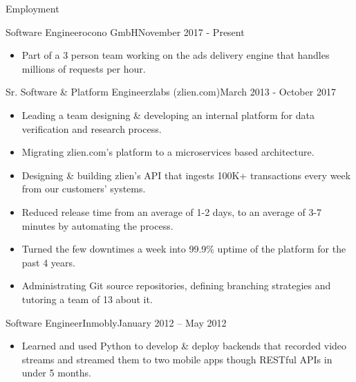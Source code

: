 \documentclass[]{mosabcv}
\begin{document}
    \makeheader

    \begin{cvsection}{Employment}
        \begin{cvsubsection}{Software Engineer}{ocono GmbH}{November 2017 - Present}
            \begin{itemize}
                \item Part of a 3 person team working on the ads delivery engine that handles millions of requests per hour.
            \end {itemize}

        \end{cvsubsection}
			\begin{cvsubsection}{Sr. Software \& Platform Engineer}{zlabs (zlien.com)}{March 2013 - October 2017}
            \begin{itemize}
                \item Leading a team designing \& developing an internal platform for data verification and research process.
                \item Migrating zlien.com's platform to a microservices based architecture.
                \item Designing \& building zlien's API that ingests 100K+ transactions every week from our customers' systems.
                \item Reduced release time from an average of 1-2 days, to an average of 3-7 minutes by automating the process.
                \item Turned the few downtimes a week into 99.9\% uptime of the platform for the past 4 years.
                \item Administrating Git source repositories, defining branching strategies and tutoring a team of 13 about it.
            \end{itemize}
        \end{cvsubsection}

        \begin{cvsubsection}{Software Engineer}{Inmobly}{January 2012 – May 2012}
            \begin{itemize}
                \item Learned and used Python to develop \& deploy backends that recorded video streams and streamed them to two mobile apps though RESTful APIs in under 5 months.
            \end{itemize}
        \end{cvsubsection}


\end{cvsection}
\end{document}
